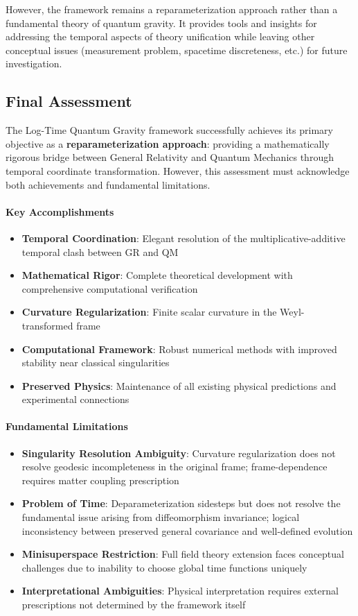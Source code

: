 However, the framework remains a reparameterization approach rather than a fundamental theory of quantum gravity. It provides tools and insights for addressing the temporal aspects of theory unification while leaving other conceptual issues (measurement problem, spacetime discreteness, etc.) for future investigation.

\subsection{Final Assessment}
\label{subsec:final_assessment}

The Log-Time Quantum Gravity framework successfully achieves its primary objective as a \textbf{reparameterization approach}: providing a mathematically rigorous bridge between General Relativity and Quantum Mechanics through temporal coordinate transformation. However, this assessment must acknowledge both achievements and fundamental limitations.

\paragraph{Key Accomplishments}
\begin{itemize}
\item \textbf{Temporal Coordination}: Elegant resolution of the multiplicative-additive temporal clash between GR and QM
\item \textbf{Mathematical Rigor}: Complete theoretical development with comprehensive computational verification
\item \textbf{Curvature Regularization}: Finite scalar curvature in the Weyl-transformed frame
\item \textbf{Computational Framework}: Robust numerical methods with improved stability near classical singularities
\item \textbf{Preserved Physics}: Maintenance of all existing physical predictions and experimental connections
\end{itemize}

\paragraph{Fundamental Limitations}
\begin{itemize}
\item \textbf{Singularity Resolution Ambiguity}: Curvature regularization does not resolve geodesic incompleteness in the original frame; frame-dependence requires matter coupling prescription
\item \textbf{Problem of Time}: Deparameterization sidesteps but does not resolve the fundamental issue arising from diffeomorphism invariance; logical inconsistency between preserved general covariance and well-defined evolution
\item \textbf{Minisuperspace Restriction}: Full field theory extension faces conceptual challenges due to inability to choose global time functions uniquely
\item \textbf{Interpretational Ambiguities}: Physical interpretation requires external prescriptions not determined by the framework itself
\end{itemize}

